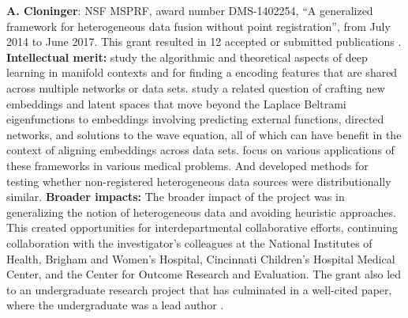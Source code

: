 {\bf A. Cloninger}: NSF MSPRF, award number DMS-1402254, ``A generalized framework for heterogeneous data fusion without point registration'', from July 2014 to June 2017. This grant resulted in 12 accepted or submitted publications \cite{mishne2017diffusion,cloninger2018bigeometric,shaham2018provable,cloninger2017spectral, cloninger2017note, cloninger2017prediction,cloninger2016function, downing2017describing, bates2017outcome, katzman2018deepsurv,cheng2017two,cloninger2018people}.
{\bf Intellectual merit:} \cite{mishne2017diffusion,cloninger2018bigeometric,shaham2018provable} study the algorithmic and theoretical aspects of deep learning in manifold contexts and for finding a encoding features that are shared across multiple networks or data sets.  \cite{cloninger2017spectral, cloninger2017note, cloninger2017prediction} study a related question of crafting new embeddings and latent spaces that move beyond the Laplace Beltrami eigenfunctions to embeddings involving predicting external functions, directed networks, and solutions to the wave equation, all of which can have benefit in the context of aligning embeddings across data sets.  \cite{cloninger2016function, downing2017describing, bates2017outcome, katzman2018deepsurv} focus on various applications of these frameworks in various medical problems.  And \cite{cheng2017two,cloninger2018people} developed methods for testing whether non-registered heterogeneous data sources were distributionally similar.
{\bf Broader impacts:}
The broader impact of the project was in generalizing the notion of heterogeneous data and avoiding heuristic approaches.  This created opportunities for interdepartmental collaborative efforts, continuing collaboration with the investigator's colleagues at the National Institutes of Health, Brigham and Women's Hospital, Cincinnati Children's Hospital Medical Center, and the Center for Outcome Research and Evaluation.  The grant also led to an undergraduate research project that has culminated in a well-cited paper, where the undergraduate was a lead author \cite{katzman2018deepsurv}.


